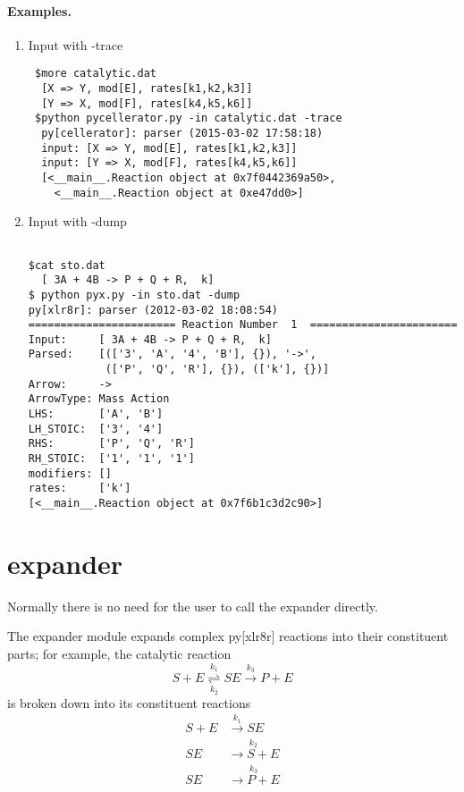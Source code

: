 \paragraph{Examples.\\}


\begin{enumerate}
\item Input with {-trace}
 
\begin{lstlisting}
 $more catalytic.dat
  [X => Y, mod[E], rates[k1,k2,k3]]
  [Y => X, mod[F], rates[k4,k5,k6]]
 $python pycellerator.py -in catalytic.dat -trace
  py[cellerator]: parser (2015-03-02 17:58:18)
  input: [X => Y, mod[E], rates[k1,k2,k3]]
  input: [Y => X, mod[F], rates[k4,k5,k6]]
  [<__main__.Reaction object at 0x7f0442369a50>, 
    <__main__.Reaction object at 0xe47dd0>]
\end{lstlisting}
 

\item Input with {-dump}
\begin{lstlisting}
 
$cat sto.dat
  [ 3A + 4B -> P + Q + R,  k]
$ python pyx.py -in sto.dat -dump
py[xlr8r]: parser (2012-03-02 18:08:54)
======================= Reaction Number  1  =======================
Input:     [ 3A + 4B -> P + Q + R,  k]
Parsed:    [(['3', 'A', '4', 'B'], {}), '->', 
            (['P', 'Q', 'R'], {}), (['k'], {})]
Arrow:     ->
ArrowType: Mass Action
LHS:       ['A', 'B']
LH_STOIC:  ['3', '4']
RHS:       ['P', 'Q', 'R']
RH_STOIC:  ['1', '1', '1']
modifiers: []
rates:     ['k']
[<__main__.Reaction object at 0x7f6b1c3d2c90>]
\end{lstlisting}
 




\end{enumerate}




\section{expander}

Normally there is no need for the user to call the expander directly. 

The expander module expands complex py[xlr8r] reactions into their constituent parts; for example, the catalytic reaction 
$$ S + E \underset{k_2}{\overset {k_1}{\rightleftharpoons}} SE \overset{k_3}{\to} P+E $$
is broken down into its constituent reactions
\begin{align*}
S+E &\overset{k_1}{\to} SE\\
SE &\overset{k_2}{\to S+E}\\
SE &\overset{k_3}{\to P+E}
\end{align*}


